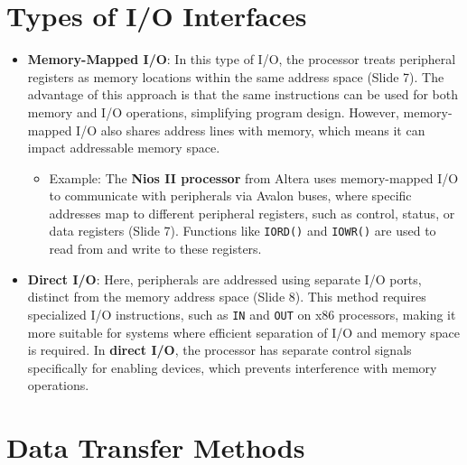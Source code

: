 \documentclass[
  14pt,
  a4paper,
  numbers=noendperiod,
  headinclude=true,
  footinclude=true,
  DIV=calc]{scrreprt}
\providecommand{\tightlist}{%
  \setlength{\itemsep}{0pt}\setlength{\parskip}{0pt}}\usepackage{longtable,booktabs,array}
\begin{document}
\section{Types of I/O Interfaces}\label{types-of-io-interfaces}

\begin{itemize}
\item
  \textbf{Memory-Mapped I/O}: In this type of I/O, the processor treats
  peripheral registers as memory locations within the same address space
  (Slide 7). The advantage of this approach is that the same
  instructions can be used for both memory and I/O operations,
  simplifying program design. However, memory-mapped I/O also shares
  address lines with memory, which means it can impact addressable
  memory space.

  \begin{itemize}
  \tightlist
  \item
    Example: The \textbf{Nios II processor} from Altera uses
    memory-mapped I/O to communicate with peripherals via Avalon buses,
    where specific addresses map to different peripheral registers, such
    as control, status, or data registers (Slide 7). Functions like
    \texttt{IORD()} and \texttt{IOWR()} are used to read from and write
    to these registers.
  \end{itemize}
\item
  \textbf{Direct I/O}: Here, peripherals are addressed using separate
  I/O ports, distinct from the memory address space (Slide 8). This
  method requires specialized I/O instructions, such as \texttt{IN} and
  \texttt{OUT} on x86 processors, making it more suitable for systems
  where efficient separation of I/O and memory space is required. In
  \textbf{direct I/O}, the processor has separate control signals
  specifically for enabling devices, which prevents interference with
  memory operations.
\end{itemize}

\section{Data Transfer Methods}\label{data-transfer-methods}
\end{document}
